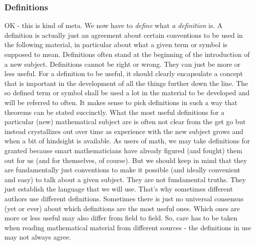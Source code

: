 \subsubsection{Definitions}
OK - this is kind of meta. We now have to \emph{define} what \emph{a definition} is. A definition is actually just an agreement about certain conventions to be used in the following material, in particular about what a given term or symbol is supposed to mean. Definitions often stand at the beginning of the introduction of a new subject. Definitions cannot be right or wrong. They can just be more or less useful. For a definition to be useful, it should clearly encapsulate a concept that is important in the development of all the things further down the line. The so defined term or symbol shall be used a lot in the material to be developed and will be referred to often. It makes sense to pick definitions in such a way that theorems can be stated succinctly. What the most useful definitions for a particular (new) mathematical subject are is often not clear from the get go but instead crystallizes out over time as experience with the new subject grows and when a bit of hindsight is available. As users of math, we may take definitions for granted because smart mathematicians have already figured (and fought) them out for us (and for themselves, of course). But we should keep in mind that they are fundamentally just conventions to make it possible (and ideally convenient and easy) to talk about a given subject. They are not fundamental truths. They just establish the language that we will use. That's why sometimes different authors use different definitions. Sometimes there is just no universal consensus (yet or ever) about which definitions are the most useful ones. Which ones are more or less useful may also differ from field to field. So, care has to be taken when reading mathematical material from different sources - the definitions in use may not always agree.



